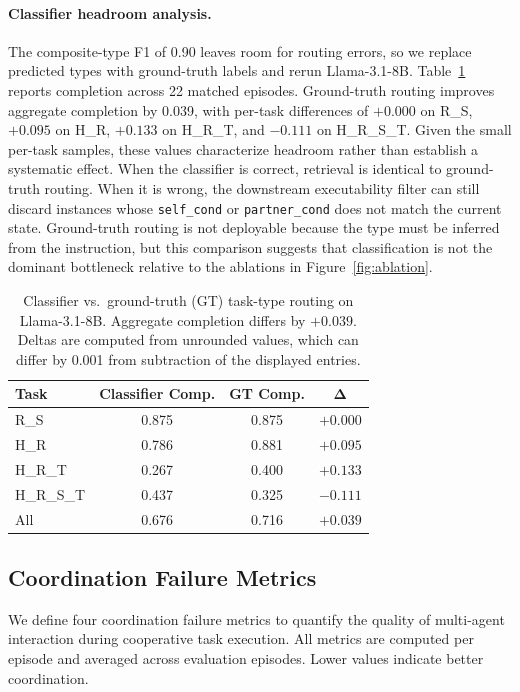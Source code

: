 \documentclass{article}
\theoremstyle{plain}
\theoremstyle{definition}
\theoremstyle{remark}
\begin{document}
\paragraph{Classifier headroom analysis.}
The composite-type F1 of 0.90 leaves room for routing errors, so we replace predicted types with ground-truth labels and rerun Llama-3.1-8B. Table~\ref{tab:gt_vs_oracle} reports completion across 22 matched episodes. Ground-truth routing improves aggregate completion by 0.039, with per-task differences of $+0.000$ on R\_S, $+0.095$ on H\_R, $+0.133$ on H\_R\_T, and $-0.111$ on H\_R\_S\_T. Given the small per-task samples, these values characterize headroom rather than establish a systematic effect. When the classifier is correct, retrieval is identical to ground-truth routing. When it is wrong, the downstream executability filter can still discard instances whose \texttt{self\_cond} or \texttt{partner\_cond} does not match the current state. Ground-truth routing is not deployable because the type must be inferred from the instruction, but this comparison suggests that classification is not the dominant bottleneck relative to the ablations in Figure~\ref{fig:ablation}.

\begin{table}[h]
\centering
\caption{Classifier vs.\ ground-truth (GT) task-type routing on Llama-3.1-8B. Aggregate completion differs by $+0.039$. Deltas are computed from unrounded values, which can differ by 0.001 from subtraction of the displayed entries.}
\label{tab:gt_vs_oracle}
\begin{tabular}{@{}l|ccc@{}}
\toprule
\textbf{Task} & \textbf{Classifier Comp.} & \textbf{GT Comp.} & $\boldsymbol{\Delta}$ \\
\midrule
R\_S         & 0.875 & 0.875 & $+0.000$ \\
H\_R         & 0.786 & 0.881 & $+0.095$ \\
H\_R\_T      & 0.267 & 0.400 & $+0.133$ \\
H\_R\_S\_T   & 0.437 & 0.325 & $-0.111$ \\
\midrule
All          & 0.676 & 0.716 & $+0.039$ \\
\bottomrule
\end{tabular}
\end{table}
\subsection{Coordination Failure Metrics}
\label{appendix:failure_metrics}

We define four coordination failure metrics to quantify the quality of multi-agent interaction during cooperative task execution. All metrics are computed per episode and averaged across evaluation episodes. Lower values indicate better coordination.
\end{document}
